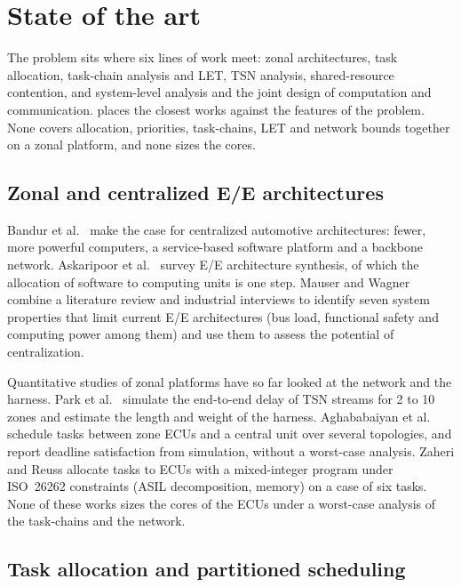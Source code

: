 \section{State of the art}
\label{sec:related}

\begin{inbrief}
The problem sits where six lines of work meet: zonal architectures,
task allocation, task-chain analysis and LET, TSN analysis, shared-resource
contention, and system-level analysis and the joint design of computation
and communication.
 places the closest works against the features of the
problem. None covers allocation, priorities, task-chains, LET and network
bounds together on a zonal platform, and none sizes the cores.
\end{inbrief}

\subsection{Zonal and centralized E/E architectures}

Bandur et al.\ \cite{bandur2021centralized} make the case for centralized
automotive architectures: fewer, more powerful computers, a service-based
software platform and a backbone network. Askaripoor et al.\
\cite{askaripoor2022synthesis} survey E/E architecture synthesis, of which
the allocation of software to computing units is one step. Mauser and
Wagner \cite{mauser2025centralization} combine a literature review and
industrial interviews to identify seven system properties that limit
current E/E architectures (bus load, functional safety and computing
power among them) and use them to assess the potential of
centralization.

Quantitative studies of zonal platforms have so far looked at the network
and the harness. Park et al.\ \cite{park2024zonal} simulate the end-to-end delay of TSN
streams for 2 to 10 zones and estimate the length and weight of the
harness. Aghababaiyan et
al.\ \cite{aghababaiyan2025deterministic} schedule tasks between zone ECUs
and a central unit over several topologies, and report deadline
satisfaction from simulation, without a worst-case analysis. Zaheri and
Reuss \cite{zaheri2025asil} allocate tasks to ECUs with a mixed-integer
program under ISO~26262 constraints \cite{iso26262} (ASIL decomposition,
memory) on a case of six tasks. None of these works sizes the cores of the
ECUs under a worst-case analysis of the task-chains and the network.

\subsection{Task allocation and partitioned scheduling}

